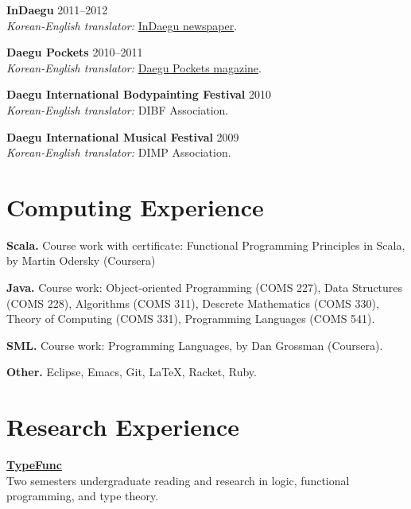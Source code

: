 \documentclass[margin,line]{resume}
\begin{document}
\begin{resume}
    \textbf{InDaegu} \hfill 2011--2012\\
    \textsl{Korean-English translator:} 
    \href{http://www.in-daegu.com/}{InDaegu newspaper}.
    
        \textbf{Daegu Pockets}  \hfill 2010--2011\\
    \textsl{Korean-English translator:}
    \href{http://daegupockets.com/}{Daegu Pockets magazine}.
    
    \textbf{Daegu International Bodypainting Festival}  \hfill 2010\\
    \textsl{Korean-English translator:} DIBF Association.
    
    \textbf{Daegu International Musical Festival}   \hfill 2009\\
    \textsl{Korean-English translator:} DIMP Association.
 


    \section{\mysidestyle Computing Experience} 
     
    \textbf{Scala.} Course work with certificate: Functional Programming Principles in
    Scala, by Martin Odersky (Coursera)

    \textbf{Java.} Course work: Object-oriented Programming 
    ({\small COMS 227}), Data Structures ({\small COMS 228}), Algorithms ({\small COMS 311}),
    Descrete Mathematics ({\small COMS 330}), Theory of Computing ({\small COMS 331}),
    Programming Languages ({\small COMS 541}).
   
    \textbf{SML.} Course work: Programming Languages, by Dan Grossman (Coursera).

    \textbf{Other.} Eclipse, Emacs, Git, \LaTeX, Racket, Ruby.

    \section{\mysidestyle Research Experience} 
    {\bf \href{https://github.com/TypeFunc}{TypeFunc}}\\ Two semesters undergraduate reading and research in logic, functional programming, and type theory.
    

\end{resume}
\end{document}
